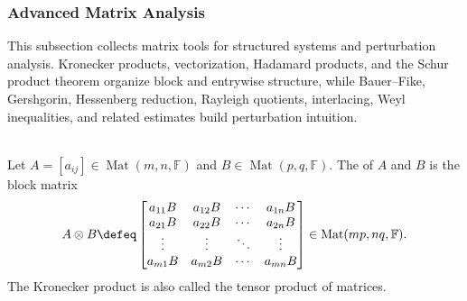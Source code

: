 \subsubsection{Advanced Matrix Analysis}

This subsection collects matrix tools for structured systems and perturbation analysis. Kronecker products, vectorization, Hadamard products, and the Schur product theorem organize block and entrywise structure, while Bauer--Fike, Gershgorin, Hessenberg reduction, Rayleigh quotients, interlacing, Weyl inequalities, and related estimates build perturbation intuition.

\begin{definition} \label{def:kronecker-product} \\
Let $A=[a_{ij}]\in\operatorname{Mat}(m,n,\mathbb{F})$ and $B\in\operatorname{Mat}(p,q,\mathbb{F})$. The  of $A$ and $B$ is the block matrix
\begin{align}
A\otimes B
\defeq
\begin{bmatrix}
a_{11}B & a_{12}B & \cdots & a_{1n}B\\
a_{21}B & a_{22}B & \cdots & a_{2n}B\\
\vdots & \vdots & \ddots & \vdots\\
a_{m1}B & a_{m2}B & \cdots & a_{mn}B
\end{bmatrix}
\in\operatorname{Mat}(mp,nq,\mathbb{F}).
\nonumber
\end{align}
The Kronecker product is also called the tensor product of matrices.
\end{definition}


